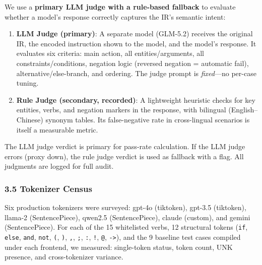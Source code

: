 We use a \textbf{primary LLM judge with a rule-based fallback} to evaluate whether a model's response correctly captures the IR's semantic intent:



\begin{enumerate}

\def\labelenumi{\arabic{enumi}.}

\item

  \textbf{LLM Judge (primary)}: A separate model (GLM-5.2) receives the original IR, the encoded instruction shown to the model, and the model's response. It evaluates six criteria: main action, all entities/arguments, all constraints/conditions, negation logic (reversed negation = automatic fail), alternative/else-branch, and ordering. The judge prompt is \emph{fixed}---no per-case tuning.

\item

  \textbf{Rule Judge (secondary, recorded)}: A lightweight heuristic checks for key entities, verbs, and negation markers in the response, with bilingual (English--Chinese) synonym tables. Its false-negative rate in cross-lingual scenarios is itself a measurable metric.

\end{enumerate}



The LLM judge verdict is primary for pass-rate calculation. If the LLM judge errors (proxy down), the rule judge verdict is used as fallback with a flag. All judgments are logged for full audit.



\subsubsection{3.5 Tokenizer Census}\label{tokenizer-census}



Six production tokenizers were surveyed: gpt-4o (tiktoken), gpt-3.5 (tiktoken), llama-2 (SentencePiece), qwen2.5 (SentencePiece), claude (custom), and gemini (SentencePiece). For each of the 15 whitelisted verbs, 12 structural tokens (\texttt{if}, \texttt{else}, \texttt{and}, \texttt{not}, \texttt{(}, \texttt{)}, \texttt{,}, \texttt{;}, \texttt{:}, \texttt{!}, \texttt{@}, \texttt{-\textgreater{}}), and the 9 baseline test cases compiled under each frontend, we measured: single-token status, token count, UNK presence, and cross-tokenizer variance.



